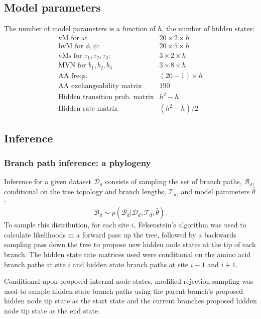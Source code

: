 \documentclass[nogrid]{MBE}%
\begin{document}
\subsection{Model parameters}
The number of model parameters is a function of $h$, the number of hidden states:
\begin{equation*}
\begin{array}{ccc}
	\text{vM for }\omega: & 20\times2\times h\\
	\text{bvM for }\phi,\psi: & 20\times5\times h\\
	\text{vMs for }\tau_{1},\tau_{2},\tau_{3}: & 3\times2\times h\\
	\text{MVN for }b_{1},b_{2},b_{3} & 3\times8\times h\\
	\text{AA freqs.} & (20-1)\times h\\
	\text{AA exchangeability matrix} & 190\\
	\text{Hidden transition prob. matrix} & h^{2}-h\\
	\text{Hidden rate matrix} & (h^{2}-h)/2
\end{array}
\end{equation*}

\subsection{Inference}

\subsubsection{Branch path inference: a phylogeny}
Inference for a given dataset $\mathcal{D}_{d}$ consists of sampling the set of branch paths, $\mathcal{B}_{d}$, conditional on the tree topology and branch lengths, $\mathcal{T}_{d}$, and model parameters $\hat{\theta}$:
\begin{equation}
\mathcal{B}_{d} \sim p(\mathcal{B}_{d}|\mathcal{D}_{d},\mathcal{T}_d,\hat{\theta}).
\end{equation}
To sample this distribution, for each site $i$,  Felsenstein's algorithm was used to calculate likelihoods in a forward pass up the tree, followed by a backwards sampling pass down the tree to propose new hidden node states at the tip of each branch. The hidden state rate matrices used were conditional on the amino acid branch paths at site $i$ and hidden state branch paths at site $i-1$ and $i+1$.

Conditional upon proposed internal node states, modified rejection sampling was used to sample hidden state branch paths using the parent branch's proposed hidden node tip state as the start state and the current branches proposed hidden node tip state as the end state.
\end{document}
